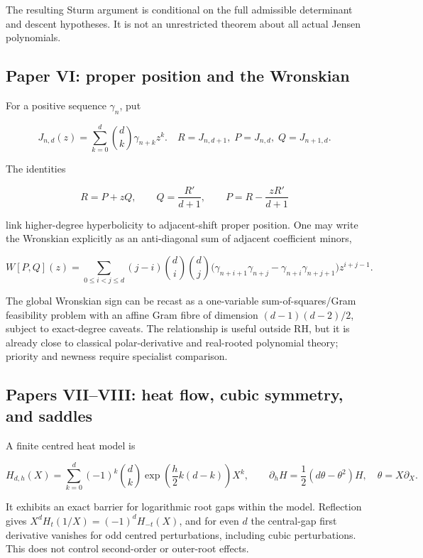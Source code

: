 \documentclass[
  10pt,
  a4paper,
  10pt,
  oneside,
  openany]{book}
\begin{document}
The resulting Sturm argument is conditional on the full admissible
determinant and descent hypotheses. It is not an unrestricted theorem
about all actual Jensen polynomials.

\subsection{Paper VI: proper position and the
Wronskian}\label{paper-vi-proper-position-and-the-wronskian}

For a positive sequence \(\gamma_n\), put

\[
J_{n,d}(z)=\sum_{k=0}^{d}\binom dk\gamma_{n+k}z^k.
\quad R=J_{n,d+1},\;P=J_{n,d},\;Q=J_{n+1,d}.
\tag{S3.7}\label{eq:S3.7}
\]

The identities

\[
R=P+zQ,\qquad Q=\frac{R'}{d+1},\qquad
P=R-\frac{zR'}{d+1}
\tag{S3.8}\label{eq:S3.8}
\]

link higher-degree hyperbolicity to adjacent-shift proper position. One
may write the Wronskian explicitly as an anti-diagonal sum of adjacent
coefficient minors,

\[
W[P,Q](z)=\sum_{0\le i<j\le d}
(j-i)\binom di\binom dj
\bigl(\gamma_{n+i+1}\gamma_{n+j}-\gamma_{n+i}\gamma_{n+j+1}\bigr)z^{i+j-1}.
\tag{S3.9}\label{eq:S3.9}
\]

The global Wronskian sign can be recast as a one-variable
sum-of-squares/Gram feasibility problem with an affine Gram fibre of
dimension \((d-1)(d-2)/2\), subject to exact-degree caveats. The
relationship is useful outside RH, but it is already close to classical
polar-derivative and real-rooted polynomial theory; priority and newness
require specialist comparison.

\subsection{Papers VII--VIII: heat flow, cubic symmetry, and
saddles}\label{papers-viiviii-heat-flow-cubic-symmetry-and-saddles}

A finite centred heat model is

\[
H_{d,h}(X)=\sum_{k=0}^d(-1)^k\binom dk\exp\!\left(\frac h2k(d-k)\right)X^k,
\qquad \partial_hH=\frac12(d\theta-\theta^2)H,
\quad\theta=X\partial_X.
\tag{S3.10}\label{eq:S3.10}
\]

It exhibits an exact barrier for logarithmic root gaps within the model.
Reflection gives \(X^dH_t(1/X)=(-1)^dH_{-t}(X)\), and for even \(d\) the
central-gap first derivative vanishes for odd centred perturbations,
including cubic perturbations. This does not control second-order or
outer-root effects.
\end{document}
